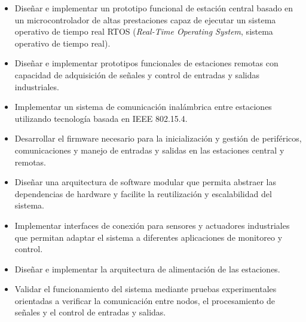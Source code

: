 \begin{itemize}
	\item Diseñar e implementar un prototipo funcional de estación central basado en un microcontrolador de altas prestaciones capaz de ejecutar un sistema operativo de tiempo real RTOS (\textit{Real-Time Operating System}, sistema operativo de tiempo real).
	
	\item Diseñar e implementar prototipos funcionales de estaciones remotas con capacidad de adquisición de señales y control de entradas y salidas industriales.
	
	\item Implementar un sistema de comunicación inalámbrica entre estaciones utilizando tecnología basada en IEEE 802.15.4.
	
	\item Desarrollar el firmware necesario para la inicialización y gestión de periféricos, comunicaciones y manejo de entradas y salidas en las estaciones central y remotas.
	
	\item Diseñar una arquitectura de software modular que permita abstraer las dependencias de hardware y facilite la reutilización y escalabilidad del sistema.
	
	\item Implementar interfaces de conexión para sensores y actuadores industriales que permitan adaptar el sistema a diferentes aplicaciones de monitoreo y control.
	
	\item Diseñar e implementar la arquitectura de alimentación de las estaciones.
	
	\item Validar el funcionamiento del sistema mediante pruebas experimentales orientadas a verificar la comunicación entre nodos, el procesamiento de señales y el control de entradas y salidas.
	
\end{itemize}
